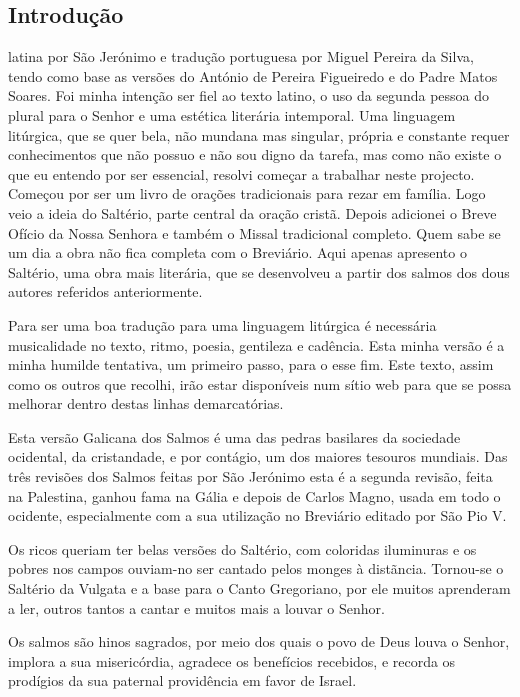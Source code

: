 
\subsection{Introdução}

 latina por São Jerónimo e tradução portuguesa por Miguel Pereira da Silva, tendo como base as versões do António de Pereira Figueiredo e do Padre Matos Soares. Foi minha intenção ser fiel ao texto latino, o uso da segunda pessoa do plural para o Senhor e uma estética literária intemporal. Uma linguagem litúrgica, que se quer bela, não mundana mas singular, própria e constante requer conhecimentos que não possuo e não sou digno da tarefa, mas como não existe o que eu entendo por ser essencial, resolvi começar a trabalhar neste projecto. Começou por ser um livro de orações tradicionais para rezar em família. Logo veio a ideia do Saltério, parte central da oração cristã. Depois adicionei o Breve Ofício da Nossa Senhora e também o Missal tradicional completo. Quem sabe se um dia a obra não fica completa com o Breviário. Aqui apenas apresento o Saltério, uma obra mais literária, que se desenvolveu a partir dos salmos dos dous autores referidos anteriormente.

Para ser uma boa tradução para uma linguagem litúrgica é necessária musicalidade no texto, ritmo, poesia, gentileza e cadência. Esta minha versão é a minha humilde tentativa, um primeiro passo, para o esse fim. Este texto, assim como os outros que recolhi, irão estar disponíveis num sítio web para que se possa melhorar dentro destas linhas demarcatórias.

Esta versão Galicana dos Salmos é uma das pedras basilares da sociedade ocidental, da cristandade, e por contágio, um dos maiores tesouros mundiais. Das três revisões dos Salmos feitas por São Jerónimo esta é a segunda revisão, feita na Palestina, ganhou fama na Gália e depois de Carlos Magno, usada em todo o ocidente, especialmente com a sua utilização no Breviário editado por São Pio V.

Os ricos queriam ter belas versões do Saltério, com coloridas iluminuras e os pobres nos campos ouviam-no ser cantado pelos monges à distãncia. Tornou-se o Saltério da Vulgata e a base para o Canto Gregoriano, por ele muitos aprenderam a ler, outros tantos a cantar e muitos mais a louvar o Senhor.

Os salmos são hinos sagrados, por meio dos quais o povo de Deus louva o Senhor, implora a sua misericórdia, agradece os benefícios recebidos, e recorda os prodígios da sua paternal providência em favor de Israel.

